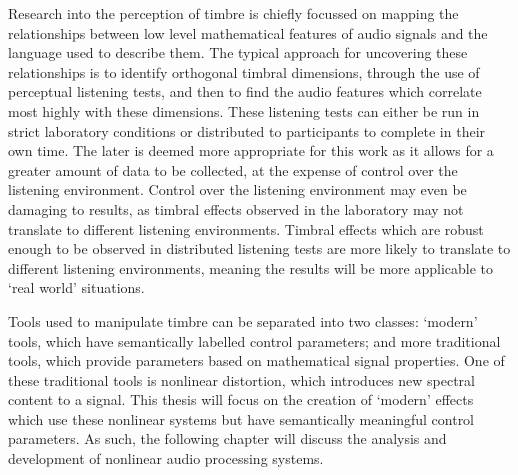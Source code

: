 	Research into the perception of timbre is chiefly focussed on mapping the relationships between low level
	mathematical features of audio signals and the language used to describe them. The typical approach for uncovering
	these relationships is to identify orthogonal timbral dimensions, through the use of perceptual listening tests,
	and then to find the audio features which correlate most highly with these dimensions. These listening tests can
	either be run in strict laboratory conditions or distributed to participants to complete in their own time. The
	later is deemed more appropriate for this work as it allows for a greater amount of data to be collected, at the
	expense of control over the listening environment. Control over the listening environment may even be damaging to
	results, as timbral effects observed in the laboratory may not translate to different listening environments.
	Timbral effects which are robust enough to be observed in distributed listening tests are more likely to translate
	to different listening environments, meaning the results will be more applicable to `real world' situations.

	Tools used to manipulate timbre can be separated into two classes: `modern' tools, which have semantically labelled
	control parameters; and more traditional tools, which provide parameters based on mathematical signal properties.
	One of these traditional tools is nonlinear distortion, which introduces new spectral content to a signal. This
	thesis will focus on the creation of `modern' effects which use these nonlinear systems but have semantically
	meaningful control parameters. As such, the following chapter will discuss the analysis and development of
	nonlinear audio processing systems.
